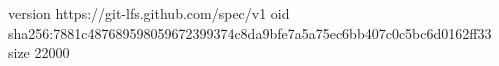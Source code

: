 version https://git-lfs.github.com/spec/v1
oid sha256:7881c487689598059672399374c8da9bfe7a5a75ec6bb407c0c5bc6d0162ff33
size 22000
